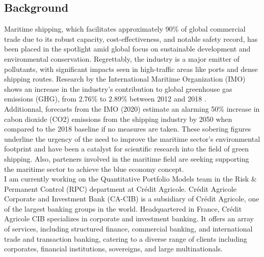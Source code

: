 \documentclass[a4paper,12pt]{article}
\begin{document}
\subsection{Background}
Maritime shipping, which facilitates approximately 90\% of global commercial trade due to its robust capacity, cost-effectiveness, and notable safety record, has been placed in the spotlight amid global focus on sustainable development and environmental conservation.
Regrettably, the industry is a major emitter of pollutants, with significant impacts seen in high-traffic areas like ports and dense shipping routes.
Research by the International Maritime Organization (IMO) shows an increase in the industry's contribution to global greenhouse gas emissions (GHG), from 2.76\% to 2.89\% between 2012 and 2018 \cite{han2023green}.\\

Additionnal, forecasts from the IMO (2020) estimate an alarming 50\% increase in cabon dioxide (CO2) emissions from the shipping industry by 2050 when compared to the 2018 baseline if no measures are taken.
These sobering figures underline the urgency of the need to improve the maritime sector's environmental footprint and have been a catalyst for scientific research into the field of green shipping. Also, parteners involved in the maritime field are seeking supporting the maritime sector to achieve the blue economy concept.\\

I am currently working on the Quantitative Portfolio Models team in the Risk \& Permanent Control (RPC) department at Crédit Agricole.
Crédit Agricole Corporate and Investment Bank (CA-CIB) is a subsidiary of Crédit Agricole, one of the largest banking groups in the world.
Headquartered in France, Crédit Agricole CIB specializes in corporate and investment banking.
It offers an array of services, including structured finance, commercial banking, and international trade and transaction banking, catering to a diverse range of clients including corporates, financial institutions, sovereigns, and large multinationals.\\
\end{document}
